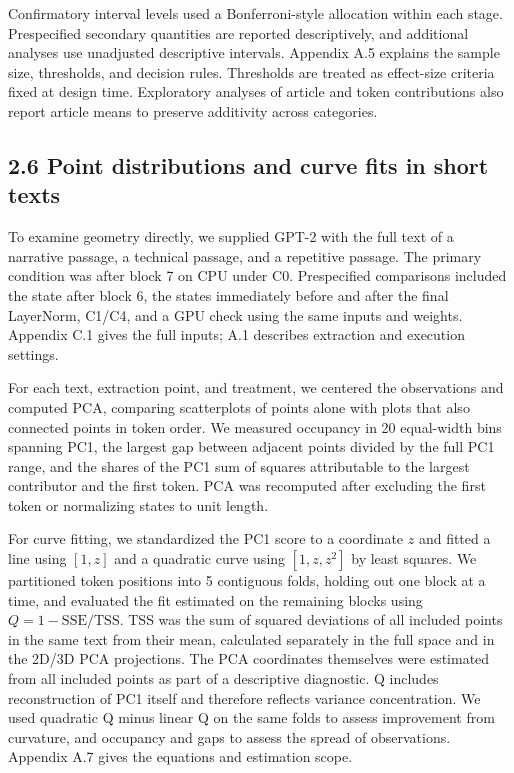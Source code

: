 Confirmatory interval levels used a Bonferroni-style allocation within each stage. Prespecified secondary quantities are reported descriptively, and additional analyses use unadjusted descriptive intervals. Appendix A.5 explains the sample size, thresholds, and decision rules. Thresholds are treated as effect-size criteria fixed at design time. Exploratory analyses of article and token contributions also report article means to preserve additivity across categories.

\FloatBarrier

\subsection{2.6 Point distributions and curve fits in short texts}\label{point-distributions-and-curve-fits-in-short-texts}

To examine geometry directly, we supplied GPT-2 with the full text of a narrative passage, a technical passage, and a repetitive passage. The primary condition was after block 7 on CPU under C0. Prespecified comparisons included the state after block 6, the states immediately before and after the final LayerNorm, C1/C4, and a GPU check using the same inputs and weights. Appendix C.1 gives the full inputs; A.1 describes extraction and execution settings.

For each text, extraction point, and treatment, we centered the observations and computed PCA, comparing scatterplots of points alone with plots that also connected points in token order. We measured occupancy in 20 equal-width bins spanning PC1, the largest gap between adjacent points divided by the full PC1 range, and the shares of the PC1 sum of squares attributable to the largest contributor and the first token. PCA was recomputed after excluding the first token or normalizing states to unit length.

For curve fitting, we standardized the PC1 score to a coordinate \(z\) and fitted a line using \([1,z]\) and a quadratic curve using \([1,z,z^2]\) by least squares. We partitioned token positions into 5 contiguous folds, holding out one block at a time, and evaluated the fit estimated on the remaining blocks using \(Q=1-\mathrm{SSE}/\mathrm{TSS}\). TSS was the sum of squared deviations of all included points in the same text from their mean, calculated separately in the full space and in the 2D/3D PCA projections. The PCA coordinates themselves were estimated from all included points as part of a descriptive diagnostic. Q includes reconstruction of PC1 itself and therefore reflects variance concentration. We used quadratic Q minus linear Q on the same folds to assess improvement from curvature, and occupancy and gaps to assess the spread of observations. Appendix A.7 gives the equations and estimation scope.

